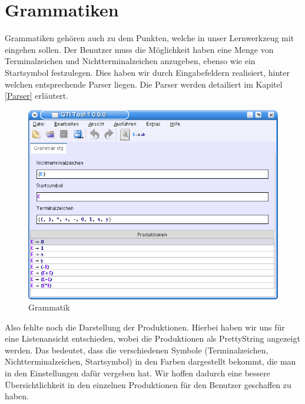 

\chapter{Grammatiken}\label{Grammars}

Grammatiken gehören auch zu dem Punkten, welche in unser Lernwerkzeug mit
eingehen sollen. Der Benutzer muss die Möglichkeit haben eine Menge von
Terminalzeichen und Nichtterminalzeichen anzugeben, ebenso wie ein Startsymbol
festzulegen. Dies haben wir durch Eingabefeldern realisiert, hinter welchen
entsprechende Parser liegen. Die Parser werden detailiert im Kapitel
\ref{Parser} erläutert.\vspace{10pt}

\begin{figure}[h!]
\begin{center}
\includegraphics[width=12cm]{../images/cfg_example.png}
\caption{Grammatik}
\end{center}
\end{figure}
\vspace{10pt}

Also fehlte noch die Darstellung der Produktionen. Hierbei haben wir uns für
eine Listenansicht entschieden, wobei die Produktionen als PrettyString
angezeigt werden. Das bedeutet, dass die verschiedenen Symbole
(Terminalzeichen, Nichtterminalzeichen, Startsymbol) in den Farben dargestellt
bekommt, die man in den Einstellungen dafür vergeben hat. Wir hoffen dadurch
eine bessere Übersichtlichkeit in den einzelnen Produktionen für den Benutzer
geschaffen zu haben.\vspace{10pt}

